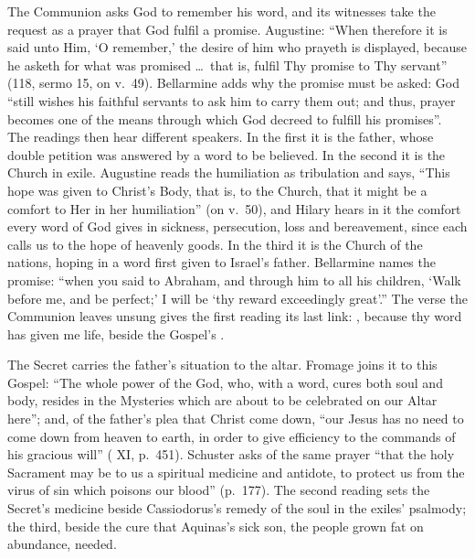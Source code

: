 The Communion asks God to remember his word, and its witnesses take the
request as a prayer that God fulfil a promise. Augustine: ``When
therefore it is said unto Him, `O remember,' the desire of him who prayeth is
displayed, because he asketh for what was promised \dots\ that is, fulfil Thy
promise to Thy servant'' (118, sermo 15, on v.~49). Bellarmine adds why the
promise must be asked: God ``still wishes his faithful servants to ask him to
carry them out; and thus, prayer becomes one of the means through which God
decreed to fulfill his promises''. The readings then hear different speakers.
In the first it is the father, whose double petition was answered by a word to
be believed. In the second it is the Church in exile. Augustine reads the
humiliation as tribulation and says, ``This hope was given to Christ's Body,
that is, to the Church, that it might be a comfort to Her in her humiliation''
(on v.~50), and Hilary hears in it the comfort every word of God gives in
sickness, persecution, loss and bereavement, since each calls us to the hope of
heavenly goods. In the third it is the Church of the nations, hoping in a word
first given to Israel's father. Bellarmine names the promise: ``when you said
to Abraham, and through him to all his children, `Walk before me, and be
perfect;' I will be `thy reward exceedingly great'.'' The verse the Communion
leaves unsung gives the first reading its last link: , because thy word has given me life, beside the Gospel's
.

The Secret carries the father's situation to the altar. Fromage joins it to
this Gospel: ``The whole power of the God, who, with a word, cures both soul
and body, resides in the Mysteries which are about to be celebrated on our
Altar here''; and, of the father's plea that Christ come down, ``our Jesus has no need to
come down from heaven to earth, in order to give efficiency to the commands of
his gracious will'' ( XI, p.~451). Schuster asks of
the same prayer ``that the holy Sacrament may be to us a spiritual medicine and
antidote, to protect us from the virus of sin which poisons our blood''
(p.~177). The second reading sets the Secret's medicine beside Cassiodorus's
remedy of the soul in the exiles' psalmody; the third, beside the cure that
Aquinas's sick son, the people grown fat on abundance, needed.

